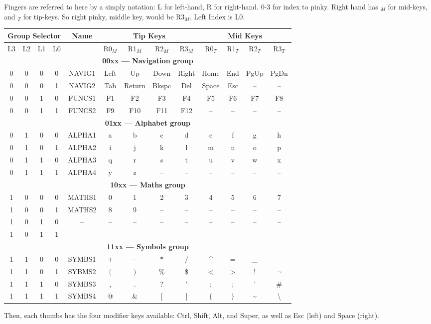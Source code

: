 \documentclass{article}
\begin{document}
Fingers are referred to here by a simply notation: L for left-hand, R for right-hand. 0-3 for index  to pinky. Right hand has $_M$ for mid-keys, and $_T$ for tip-keys. So right pinky, middle key, would be R3$_M$. Left Index is L0.

\begin{center}
	\begin{tabular}{|cccc|c|cccc|cccc|}
		\hline
		\multicolumn{4}{|c|}{\textbf{Group Selector}} & \textbf{Name} & \multicolumn{4}{|c|}{\textbf{Tip Keys}} & \multicolumn{4}{|c|}{\textbf{Mid Keys}} \\ \hline
		L3 & L2 & L1 & L0 &  & R0$_M$ & R1$_M$ & R2$_M$ & R3$_M$ & R0$_T$ & R1$_T$ & R2$_T$ & R3$_T$ \\ \hline
		\multicolumn{13}{|c|}{\textbf{00xx --- Navigation group}}\\ \hline
		0 & 0 & 0 & 0 & NAVIG1 & Left & Up & Down & Right & Home & End & PgUp & PgDn \\ \hline
		0 & 0 & 0 & 1 & NAVIG2 & Tab & Return & Bkspc & Del & Space & Esc & -- & -- \\ \hline
		0 & 0 & 1 & 0 & FUNCS1 & F1 & F2 & F3 & F4 & F5 & F6 & F7 & F8 \\ \hline
		0 & 0 & 1 & 1 & FUNCS2 & F9 & F10 & F11 & F12 & -- & -- & -- & -- \\ \hline
		\multicolumn{13}{|c|}{\textbf{01xx --- Alphabet group}}\\ \hline
		0 & 1 & 0 & 0 & ALPHA1 & a & b & c & d & e & f & g & h \\ \hline
		0 & 1 & 0 & 1 & ALPHA2 & i & j & k & l & m & n & o & p \\ \hline
		0 & 1 & 1 & 0 & ALPHA3 & q & r & s & t & u & v & w & x \\ \hline
		0 & 1 & 1 & 1 & ALPHA4 & y & z & -- & -- & -- & -- & -- & -- \\ \hline
		\multicolumn{13}{|c|}{\textbf{10xx --- Maths group}}\\ \hline
		1 & 0 & 0 & 0 & MATHS1 & 0 & 1 & 2 & 3 & 4 & 5 & 6 & 7 \\ \hline
		1 & 0 & 0 & 1 & MATHS2 & 8 & 9 & -- & -- & -- & -- & -- & -- \\ \hline
		1 & 0 & 1 & 0 & --     & -- & -- & -- & -- & -- & -- & -- & -- \\ \hline
		1 & 0 & 1 & 1 & --     & -- & -- & -- & -- & -- & -- & -- & -- \\ \hline
		\multicolumn{13}{|c|}{\textbf{11xx --- Symbols group}}\\ \hline
		1 & 1 & 0 & 0 & SYMBS1 & $+$ & $-$ & $*$ & $/$ & \textasciicircum & $=$ & \_ & -- \\ \hline
		1 & 1 & 0 & 1 & SYBMS2 & $($ & $)$ & \% & \$ & $<$ & $>$ & ! & $\neg$ \\ \hline
		1 & 1 & 1 & 0 & SYMBS3 & , & . & ? & " & : & ; & ' & \# \\ \hline
		1 & 1 & 1 & 1 & SYMBS4 & @ & \& & $[$ & $]$ & $\{$ & $\}$ & \textasciitilde & \textbackslash \\ \hline
		
	\end{tabular}
\end{center}

Then, each thumbs has the four modifier keys available: Ctrl, Shift, Alt, and Super, as well as Esc (left) and Space (right).
\end{document}
